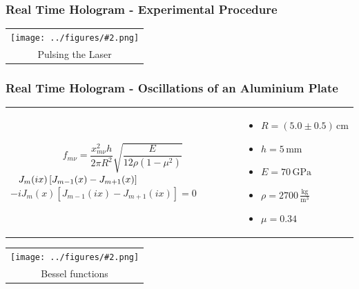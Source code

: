 \documentclass{beamer}
\newcommand{\gra}[3][]{
	\begin{table}
	\centering
	\begin{tabular}[width=\textwidth]{c}
		\texttt{[image: ../figures/\#2.png]}\\
		\small #3
	\end{tabular}
	\end{table}
}
\begin{document}
\begin{frame}
	\frametitle{Real Time Hologram - Experimental Procedure}
	\gra[0.85]{oszi-inv}{Pulsing the Laser}%
\end{frame}
\begin{frame}
	\frametitle{Real Time Hologram - Oscillations of an Aluminium Plate}	
\begin{table}
	\centering
	\begin{tabular}{p{6cm}p{4cm}}
	
	$$f_{m\nu}=\frac{x_{m\nu}^2h}{2\pi R^2}\sqrt{\frac{E}{12\rho(1-\mu^2)}}$$\newline
	${\color{white}{-}}J_m(ix)\left[ J_{m-1}(x) - J_{m+1}(x)  \right]$ \newline $- iJ_m(x)\left[ J_{m-1}(ix) - J_{m+1}(ix)  \right] = 0$
		&
	\begin{itemize}
		\item $ R = (5.0\pm0.5)\,\mathrm{cm}$
		\item $h=5\,\mathrm{mm}$
		\item $E=70\,\mathrm{GPa}$
		\item $\rho = 2700\,\frac{\mathrm{kg}}{\mathrm{m^3}}$
		\item $\mu = 0.34$ 
	\end{itemize}
	\end{tabular}
\end{table}
\end{frame}
\begin{frame}
	\gra[0.8]{bessel_2}{Bessel functions \footnotemark{}}
\end{frame}
\end{document}
